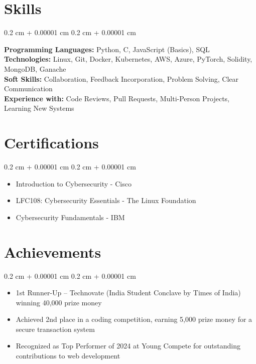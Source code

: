\documentclass[10pt, letterpaper]{article}
\newenvironment{highlights}{
    \begin{itemize}[
        topsep=0.10 cm,
        parsep=0.10 cm,
        partopsep=0pt,
        itemsep=0pt,
        leftmargin=0.4 cm + 10pt
    ]
}{
    \end{itemize}
} %
\newenvironment{onecolentry}{
    \begin{adjustwidth}{
        0.2 cm + 0.00001 cm
    }{
        0.2 cm + 0.00001 cm
    }
}{
    \end{adjustwidth}
} %
\let\hrefWithoutArrow\href
\renewcommand{\href}[2]{\hrefWithoutArrow{#1}{\ifthenelse{\equal{#2}{}}{ }{#2 }\raisebox{.15ex}{\footnotesize \faExternalLink*}}}
\begin{document}
    \section{Skills}
    \begin{onecolentry}
        \textbf{Programming Languages:} Python, C, JavaScript (Basics), SQL \\
        \textbf{Technologies:} Linux, Git, Docker, Kubernetes, AWS, Azure, PyTorch, Solidity, MongoDB, Ganache \\
        \textbf{Soft Skills:} Collaboration, Feedback Incorporation, Problem Solving, Clear Communication \\
        \textbf{Experience with:} Code Reviews, Pull Requests, Multi-Person Projects, Learning New Systems
    \end{onecolentry}
    \section{Certifications}
    \begin{onecolentry}
        \begin{highlights}
            \item Introduction to Cybersecurity - Cisco \href{https://www.credly.com/badges/a7c00b29-a55e-42e6-8fa6-90174db3e9d7/public_url}{\textcolor{primaryColor}{\small [View Certificate]}}
            \item LFC108: Cybersecurity Essentials - The Linux Foundation \href{https://www.credly.com/badges/50d5dd68-4744-4b04-b719-3f0658e97910/public_url}{\textcolor{primaryColor}{\small [View Certificate]}}
            \item Cybersecurity Fundamentals - IBM \href{https://www.credly.com/badges/0e03da41-f13a-4a06-9835-caf8a48ac10d/public_url}{\textcolor{primaryColor}{\small [View Certificate]}}
        \end{highlights}
    \end{onecolentry}
    \section{Achievements}
    \begin{onecolentry}
        \begin{highlights}
            \item 1st Runner-Up – Technovate (India Student Conclave by Times of India) winning 40,000 prize money
            \item Achieved 2nd place in a coding competition, earning 5,000 prize money for a secure transaction system
            \item Recognized as Top Performer of 2024 at Young Compete for outstanding contributions to web development
        \end{highlights}
    \end{onecolentry}
\end{document}
